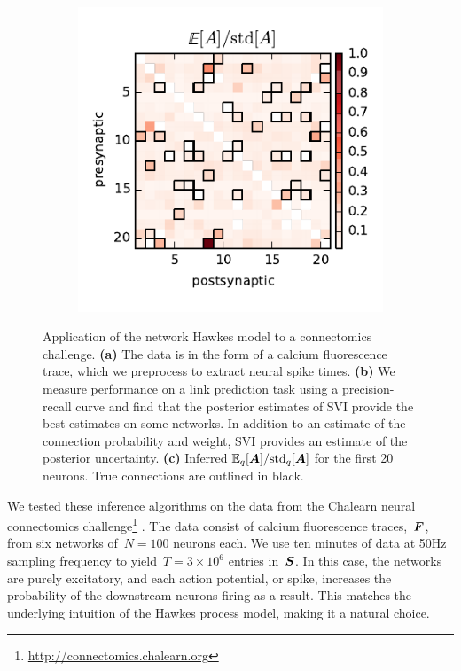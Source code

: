 \begin{figure}[t!]
\begin{center}
\begin{subfigure}[b]{0.32\linewidth}
      \label{fig:connectomics_prc}
    \end{subfigure}
    ~
    \begin{subfigure}[b]{0.32\linewidth}
      \caption{}
      \centering
      \includegraphics[width=\textwidth]{figures/ch4/chalearn_confidence.pdf} 
      \label{fig:connectomics_zscore}
    \end{subfigure}
    \caption[Discrete time Hawkes process applied to connectomics challenge]{
      Application of the network Hawkes model to a connectomics challenge.
      \textbf{(a)} The data is in the form of a calcium fluorescence trace, which we preprocess to extract neural spike times.
      \textbf{(b)} We measure performance on a link prediction task using a precision-recall curve and find that the posterior estimates of SVI provide the best estimates on some networks. In addition to an estimate of the connection probability and weight, SVI provides an estimate of the posterior uncertainty.
      \textbf{(c)} Inferred $\mathbb{E}_q[\boldsymbol{A}] / \text{std}_q[\boldsymbol{A}]$ for the first 20 neurons. True connections are outlined in black.}
    \label{fig:connectomics}
  \end{center}
\end{figure}

We tested these inference algorithms on the data from the Chalearn
neural connectomics
challenge\footnote{\url{http://connectomics.chalearn.org}}
\cite{Stetter-2012}.  The data consist of calcium fluorescence
traces,~$\boldsymbol{F}$, from six networks of~$N=100$ neurons each. We use ten
minutes of data at 50Hz sampling frequency to yield~$T=3\times 10^6$
entries in~$\boldsymbol{S}$.  In this case, the networks are purely excitatory,
and each action potential, or spike, increases the probability of the
downstream neurons firing as a result.  This matches the underlying
intuition of the Hawkes process model, making it a natural choice.


